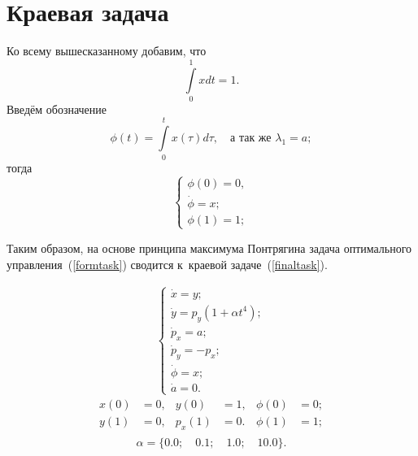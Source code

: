 
\section{Краевая задача}
Ко всему вышесказанному добавим, что 
\[
\int\limits_{0}^{1} x dt = 1.
\]
Введём обозначение
\[
\phi(t) = \int\limits_{0}^{t} x(\tau) d\tau, \quad \text{а так же } \lambda_1 = a;
\]
тогда 
\begin{equation}\label{dopeqq}
\begin{cases}
\phi(0) = 0,\\ 
\dot\phi = x;\\
\phi(1) = 1;
\end{cases}
\end{equation}

Таким образом, на основе принципа максимума Понтрягина задача оптимального управления~(\ref{formtask}) сводится к~краевой задаче~(\ref{finaltask}). 

\begin{eqnarray}\label{finaltask}
	\begin{cases}
	\dot{x} = y; \\
	\dot{y} = p_y (1 + \alpha t^4);\\ %
	\dot{p}_x = a; \\ %
	\dot{p}_y = - p_x;\\
	\dot\phi = x;\\
	\dot{a} = 0.
	\end{cases}
\end{eqnarray}
\begin{align*}
	x(0) &= 0,  & y(0) &= 1, & \phi(0) &= 0;\\
 	y(1) &= 0, & p_x(1) &= 0. & \phi(1) &= 1;\\
 	\end{align*}
\[
 	\alpha = \{0.0;\quad 0.1; \quad 1.0; \quad 10.0\}.
\]
